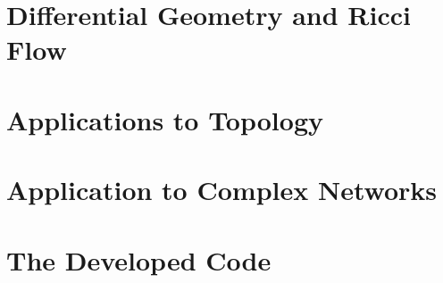 \documentclass[a4paper,12pt,oneside,customfont,custombib,PageStyleI,draftclassic]{Settings/PhDThesisPSnPDF}
\begin{document}
\chapter{Differential Geometry and Ricci Flow}\label{chap:chapter2}





\chapter{Applications to Topology}\label{chap:chapter3}




\chapter{Application to Complex Networks}\label{chap:chapter4}




\chapter{The Developed Code}\label{chap:chapter5}





%

\backmatter

\begin{spacing}{0.9}

\cleardoublepage
\nocite{*}
\printbibliography[heading=bibintoc, title={References}]

\end{spacing}

\end{document}
